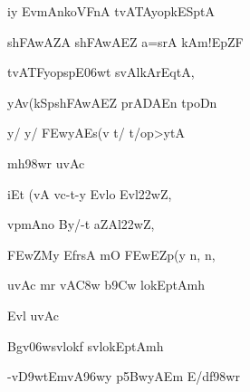{\dn iy\2 EvmAnkoVFnA\2 tvATA\0yopkESptA{\dandabdn} \dontdisplaylinenum}

{\dn sh\3FAwAZA\2 sh\3FAwAEZ a=srA kAm!EpZF \vegdn\dontdisplaylinenum}

{\dn tvATF{\qvb}yopsp\0E\306wt svA\0l\2kArEqtA,{\dandabdn} \dontdisplaylinenum}

{\dn yAv(kSpsh\3FAwAEZ prADA\0En tpoDn{\dandadn}\dontdisplaylinenum }

{\dn y/ y/ \3FEwyAEs(v\2 t/ t/op>ytA \vegdn\dontdisplaylinenum}

{\dn mh\?\398wr uvAc{\dandabdn}\dontdisplaylinenum }

{\dn iEt (vA vc-t-y Evlo Evl\?\322wZ,{\dandadn} \dontdisplaylinenum}

{\dn v\?pmAno By/-t aZA\0l\?\322wZ, \vegdn\dontdisplaylinenum}

{\dn \3FEwZMy EfrsA mO \3FEwEZp(y n, n,{\dandabdn} \dontdisplaylinenum}

{\dn uvAc mr\2 vA\3C8w\2 b\5\39Cw lokEptAmh \vegdn\dontdisplaylinenum}

{\dn Evl uvAc{\dandabdn}\dontdisplaylinenum }

{\dn Bgv\306wsv\0lok\?f sv\0lokEptAmh{\dandadn} \dontdisplaylinenum}

{\dn -v\3D9wtEmvA\396wy{\rdt} p\35BwyAEm E/df\?\398wr \vegdn\dontdisplaylinenum}

